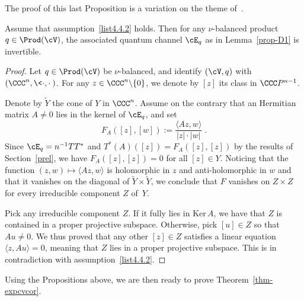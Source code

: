 The proof of this last Proposition is a variation on the theme of~\cite[Proposition~4.1]{BMS}.



\begin{prop}\label{prop-D3}
Assume that assumption~\eqref{list4.4.2} holds. Then for any $\nu$-balanced product $q\in\Prod(\cV)$, the associated quantum channel $\cE_q$ as in Lemma~\ref{prop-D1} is invertible.
\end{prop}


\begin{proof}
Let $q\in\Prod(\cV)$ be $\nu$-balanced, and
identify $(\cV,q)$ with $(\CCC^n,\<\cdot,\cdot\>)$. For any $z\in\CCC^n\backslash\{0\}$, we denote by $[z]$ its class in $\CCC P^{n-1}$.

Denote by $\tilde{Y}$ the cone of $Y$ in $\CCC^n$. Assume on the contrary that an Hermitian matrix $A \neq 0$ lies in the kernel of $\cE_q$, and set
\[
F_A([z],[w]):= \frac{\langle Az, w \rangle}{|z|\cdot |w|}\;.
\]
Since $\cE_q= n^{-1} TT^*$ and $T^* (A) ([z]) = F_A([z],[z])$ by the results of Section~\ref{prel}, we have $F_A([z],[z]) =0$ for all $[z] \in Y$. Noticing that the function $(z,w) \mapsto \langle Az, w \rangle$ is holomorphic in $z$ and anti-holomorphic in $w$ and that it vanishes on the diagonal of $\tilde{Y} \times \tilde{Y}$, we conclude that $F$ vanishes on $Z \times Z$ for every irreducible component $Z$ of~$Y$.

Pick any irreducible component $Z$. If it fully lies in $\text{Ker}\, A$, we have that $Z$ is contained in a proper projective subspace. Otherwise, pick $[u] \in Z$ so that $Au \neq 0$. We thus proved that any other $[z] \in Z$ satisfies a linear equation $\langle z, Au \rangle = 0$, meaning that $Z$ lies in a proper projective subspace. This is in contradiction with assumption~\eqref{list4.4.2}.
\end{proof}



Using the Propositions above, we are then ready to prove Theorem~\ref{thm-expcvcor}.

